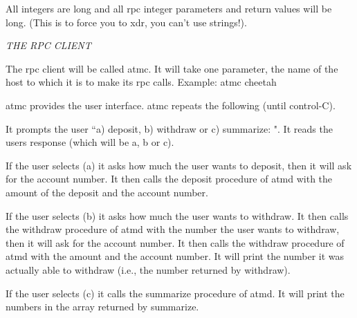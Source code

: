All integers are {\ltt{}long} and all rpc integer parameters and return
values will be {\ltt{}long}.
(This is to force you to xdr, you can't use strings!).

\bigskip
\noindent
{\it THE RPC CLIENT}

The rpc client will be called {\ltt{}atmc}.
It will take one parameter, the name of the host to which it is to make
its rpc calls.
Example: {\ltt{}atmc cheetah}

{\ltt{}atmc} provides the user interface.
{\ltt{}atmc} repeats the following (until control-C).

It prompts the user ``{\ltt{}a) deposit, b) withdraw or c) summarize: }".
It reads the users response (which will be a, b or c).

If the user selects (a) it asks how much the user wants to deposit,
then it will ask for the account number.
It then calls the {\ltt{}deposit} procedure of {\ltt{}atmd} with the amount
of the deposit and the account number.

If the user selects (b) it asks how much the user wants to withdraw.
It then calls the {\ltt{}withdraw} procedure of {\ltt{}atmd} with the 
number the user wants to withdraw,
then it will ask for the account number.
It then calls the {\ltt{}withdraw} procedure of {\ltt{}atmd} with the amount
and the account number.
It will print the number it was actually able to withdraw (i.e., the number
returned by {\ltt{}withdraw}).

If the user selects (c) it calls the {\ltt{}summarize} procedure of 
{\ltt{}atmd}.
It will print the numbers in the array returned by {\ltt{}summarize}.
\bye
